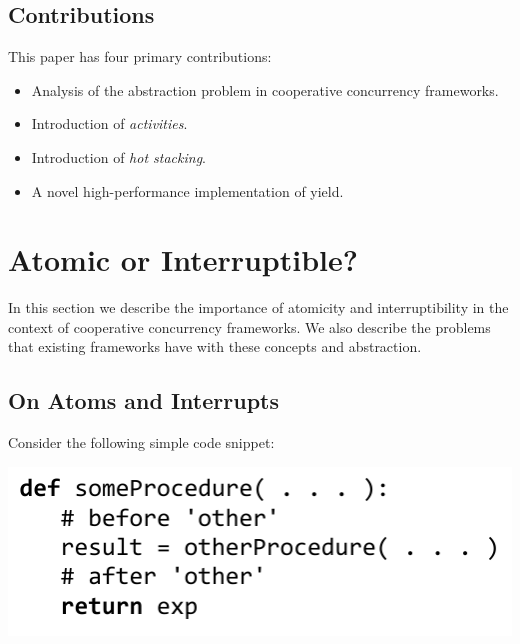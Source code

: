 \documentclass[9pt,preprint]{sigplanconf}
\begin{document}
\subsection{Contributions}

This paper has four primary contributions:

\begin{itemize}
\item Analysis of the abstraction problem in cooperative concurrency frameworks.
\item Introduction of \emph{activities}.
\item Introduction of \emph{hot stacking}.
\item A novel high-performance implementation of yield.
\end{itemize}



\section{Atomic or Interruptible?}

In this section we describe the importance of atomicity and interruptibility in the context of cooperative concurrency frameworks.
We also describe the problems that existing frameworks have with these concepts and abstraction.

\subsection{On Atoms and Interrupts}

Consider the following simple code snippet\footnotemark{}:

\noindent
\includegraphics[scale=0.7]{trivial_call}

\end{document}
